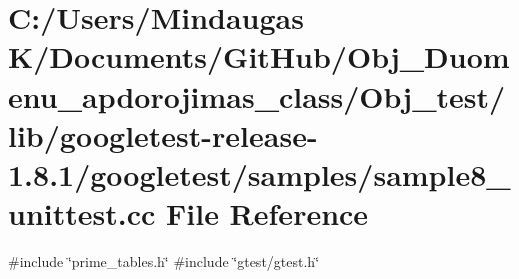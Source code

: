 \hypertarget{_obj__test_2lib_2googletest-release-1_88_81_2googletest_2samples_2sample8__unittest_8cc}{}\section{C\+:/\+Users/\+Mindaugas K/\+Documents/\+Git\+Hub/\+Obj\+\_\+\+Duomenu\+\_\+apdorojimas\+\_\+class/\+Obj\+\_\+test/lib/googletest-\/release-\/1.8.1/googletest/samples/sample8\+\_\+unittest.cc File Reference}
\label{_obj__test_2lib_2googletest-release-1_88_81_2googletest_2samples_2sample8__unittest_8cc}
{\ttfamily \#include \char`\"{}prime\+\_\+tables.\+h\char`\"{}}\newline
{\ttfamily \#include \char`\"{}gtest/gtest.\+h\char`\"{}}\newline
